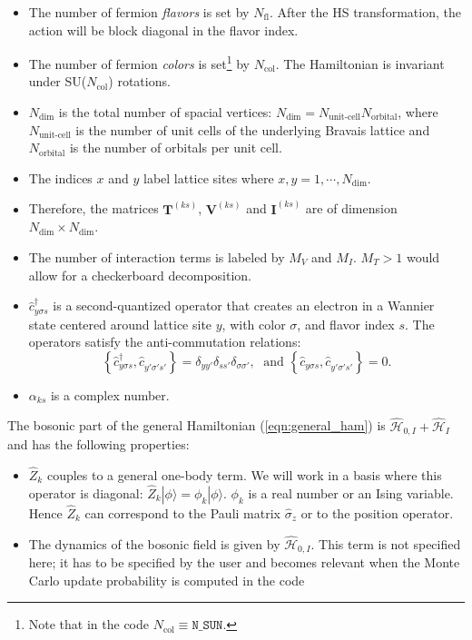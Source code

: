 \begin{itemize}
\item The number of fermion \emph{flavors} is set by $N_{\mathrm{fl}}$.  After the HS transformation, the action will be block diagonal in the flavor index. 
\item The number of fermion \emph{colors} is set\footnote{Note that  in the code $ N_{\mathrm{col}} \equiv \texttt{N\_{SUN}} $.} by $N_{\mathrm{col}}$.    The Hamiltonian is invariant under  SU($N_{\mathrm{col}}$)  rotations.
\item $N_{\mathrm{dim}}$ is the total number of spacial vertices: $N_{\mathrm{dim}}=N_{\text{unit-cell}} N_{\mathrm{orbital}}$, where $N_{\text{unit-cell}}$ is the number of unit cells of the underlying Bravais lattice and $N_{\mathrm{orbital}}$ is the number of  orbitals per unit cell.
\item The indices $x$ and $y$ label lattice sites where $x,y=1,\cdots, N_{\mathrm{dim}}$. 
\item Therefore, the  matrices $\bm{T}^{(k s)}$, $\bm{V}^{(ks)}$  and $\bm{I}^{(ks)}$ are  of dimension $N_{\mathrm{dim}}\times N_{\mathrm{dim}}$.
\item The number of interaction terms  is labeled by $M_V$   and $M_I$.   $M_T> 1 $ would allow for a checkerboard decomposition.
\item $\hat{c}^{\dagger}_{y \sigma s} $ is a second-quantized operator that creates an electron in a Wannier state centered around lattice site $y$, with color $\sigma$, and  flavor index $s$.  The operators satisfy the anti-commutation relations: 
\begin{equation}
	\left\{ \hat{c}^{\dagger}_{y \sigma s},    \hat{c}^{\phantom\dagger}_{y' \sigma' s'}  \right\}   =   \delta_{yy'}  \delta_{ss'} \delta_{\sigma\sigma'},   
	\; \text{ and } \left\{ \hat{c}^{\phantom\dagger}_{y \sigma s},    \hat{c}^{\phantom\dagger}_{y' \sigma' s'}  \right\}   =0.
\end{equation}
\item $\alpha_{k s}$ is a complex number.

\end{itemize}
The bosonic  part of the general Hamiltonian (\ref{eqn:general_ham}) is $\hat{\mathcal{H}}_{0,I}+ \hat{\mathcal{H}}_{I}$ and  has the following properties:
\begin{itemize}
\item $\hat{Z}_k$ couples to a general one-body term.  
We will work in a basis where this operator is diagonal:  $\hat{Z}_k | \phi \rangle  =  \phi_k | \phi \rangle $. $\phi_k$ is a real  number   or an  Ising variable. 
Hence   $\hat{Z}_k$ can correspond  to the Pauli matrix $\hat{\sigma}_{z}$ or to the position operator.  
\item  The dynamics of the bosonic field  is given by $\hat{\mathcal{H}}_{0,I}$. This term is not specified here; 
it has to be specified by the user and becomes relevant when the Monte Carlo update probability is computed in the code
\end{itemize}
